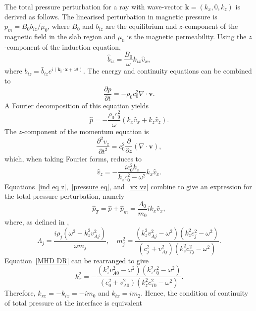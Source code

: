 	The total pressure perturbation for a ray with wave-vector $\mathbf{k} = (k_x, 0, k_z)$ is derived as follows. The linearised perturbation in magnetic pressure is $p_m = B_0b_{iz}/\mu_0$, where $B_0$ and $b_{iz}$ are the equilibrium and $z$-component of the magnetic field in the slab region and $\mu_0$ is the magnetic permeability. Using the $z$-component of the induction equation,
	\begin{equation}
	\hat{b}_{iz} = \frac{B_0}{\omega}k_{ix}\hat{v}_x, \label{ind eq z}
	\end{equation}
	where $b_{iz} = \hat{b}_{iz} e^{i(\mathbf{k_i}\cdot \mathbf{x} + \omega t)}$. The energy and continuity equations can be combined to
	\begin{equation}
	\frac{\partial p}{\partial t} = - \rho_0 c_0^2 \nabla \cdot \mathbf{v}.
	\end{equation}
	A Fourier decomposition of this equation yields
	\begin{equation}
	\hat{p} = -\frac{\rho_0c_0^2}{\omega} (k_x\hat{v}_x + k_z\hat{v}_z). \label{pressure eq}
	\end{equation}
	The $z$-component of the momentum equation is
	\begin{equation}
	\frac{\partial^2 v_z}{\partial t^2} = c_0^2 \frac{\partial}{\partial z}(\nabla \cdot \mathbf{v}),
	\end{equation}
	which, when taking Fourier forms, reduces to
	\begin{equation}
	\hat{v}_z = - \frac{ic_0^2k_z}{k_zc_0^2 - \omega^2}k_x\hat{v}_x. \label{vx vz}
	\end{equation}
	Equations~\eqref{ind eq z},~\eqref{pressure eq}, and~\eqref{vx vz} combine to give an expression for the total pressure perturbation, namely
	\begin{equation}
	\hat{p}_T = \hat{p} + \hat{p}_m = \frac{\Lambda_0}{m_0}ik_x\hat{v}_x,
	\end{equation}
	where, as defined in \cite{all_etal17},
	\begin{equation}
	\Lambda_j = \frac{i\rho_j(\omega^2 - k_z^2v_{Aj}^2)}{\omega m_j}, \quad m_j^2 = \frac{(k_z^2 v_{Aj}^2 - \omega^2)(k_z^2 c_{j}^2 - \omega^2)}{(c_j^2 + v_{Aj}^2)(k_z^2 c_{Tj}^2 - \omega^2)}.
	\end{equation}
	Equation~\eqref{MHD DR} can be rearranged to give
	\begin{equation}
	k_x^2 = -\frac{(k_z^2 v_{A0}^2 - \omega^2)(k_z^2 c_{0}^2 - \omega^2)}{(c_0^2 + v_{A0}^2)(k_z^2 c_{T0}^2 - \omega^2)}.
	\end{equation}
	Therefore, $k_{rx} = -k_{ix} = -im_0$ and $k_{tx} = im_2$. Hence, the condition of continuity of total pressure at the interface is equivalent
